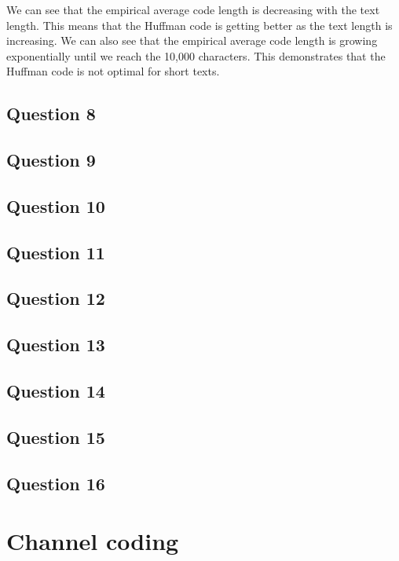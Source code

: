 \documentclass[]{template}
\begin{document}
    \noindent
    We can see that the empirical average code length is decreasing with the text length.
    This means that the Huffman code is getting better as the text length is increasing.
    We can also see that the empirical average code length is growing exponentially until we reach the 10,000 characters.
    This demonstrates that the Huffman code is not optimal for short texts.

    \subsection{Question 8}

    \subsection{Question 9}

    \subsection{Question 10}

    \subsection{Question 11}

    \subsection{Question 12}

    \subsection{Question 13}

    \subsection{Question 14}

    \subsection{Question 15}

    \subsection{Question 16}

\section{Channel coding}
\end{document}
